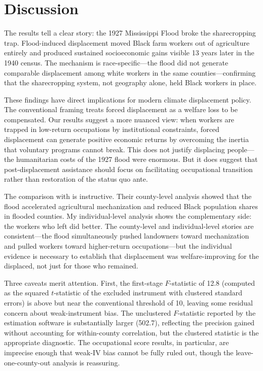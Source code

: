 \documentclass[12pt]{article}
\begin{document}



\section{Discussion}

The results tell a clear story: the 1927 Mississippi Flood broke the sharecropping trap. Flood-induced displacement moved Black farm workers out of agriculture entirely and produced sustained socioeconomic gains visible 13 years later in the 1940 census. The mechanism is race-specific---the flood did not generate comparable displacement among white workers in the same counties---confirming that the sharecropping system, not geography alone, held Black workers in place.

These findings have direct implications for modern climate displacement policy. The conventional framing treats forced displacement as a welfare loss to be compensated. Our results suggest a more nuanced view: when workers are trapped in low-return occupations by institutional constraints, forced displacement can generate positive economic returns by overcoming the inertia that voluntary programs cannot break. This does not justify displacing people---the humanitarian costs of the 1927 flood were enormous. But it does suggest that post-displacement assistance should focus on facilitating occupational transition rather than restoration of the status quo ante.

The comparison with \citet{hornbeck_naidu_2014} is instructive. Their county-level analysis showed that the flood accelerated agricultural mechanization and reduced Black population shares in flooded counties. My individual-level analysis shows the complementary side: the workers who left did better. The county-level and individual-level stories are consistent---the flood simultaneously pushed landowners toward mechanization and pulled workers toward higher-return occupations---but the individual evidence is necessary to establish that displacement was welfare-improving for the displaced, not just for those who remained.

Three caveats merit attention. First, the first-stage $F$-statistic of 12.8 (computed as the squared $t$-statistic of the excluded instrument with clustered standard errors) is above but near the conventional threshold of 10, leaving some residual concern about weak-instrument bias. The unclustered $F$-statistic reported by the estimation software is substantially larger (502.7), reflecting the precision gained without accounting for within-county correlation, but the clustered statistic is the appropriate diagnostic. The occupational score results, in particular, are imprecise enough that weak-IV bias cannot be fully ruled out, though the leave-one-county-out analysis is reassuring.
\end{document}
